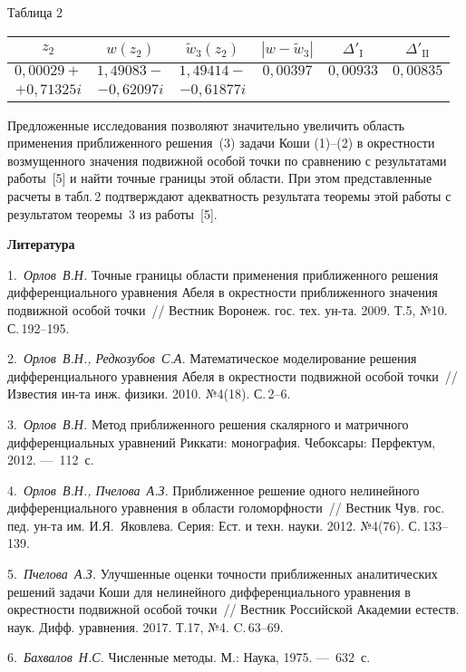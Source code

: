 \begin{table}[tb]
\footnotesize

{\raggedleft Таблица 2

}

\smallskip

{\tabcolsep=2.1mm


\bigskip

\begin{tabular}{|c|c|c|c|c|c|}
\hline
 $z_{2}$&$w(z_{2})$&$\tilde w_{3}(z_{2})$&$|w-\tilde w_{3}|$&$\Delta'_{\mathrm{I}}$&$\Delta'_{\mathrm{II}}$\\
\hline
 $0,00029+$&$1,49083-$&$1,49414-$&$0,00397$&$0,00933$&$0,00835$\\
 $+0,71325i$&$-0,62097i$&$-0,61877i$&&&\\
\hline
\end{tabular}

}
\end{table}

Предложенные исследования позволяют значительно увеличить область применения приближенного решения~(3) задачи
Коши (1)--(2) в окрестности возмущенного значения подвижной особой точки по сравнению с результатами
работы~[5] и найти точные границы этой области. При этом представленные расчеты в табл.\,2 подтверждают
адекватность результата теоремы этой работы с результатом теоремы~3 из работы~[5].

\smallskip
\centerline{\bf Литература}\nopagebreak

1.~{\it Орлов~В.Н.} Точные границы области применения приближенного решения дифференциального уравнения Абеля
в окрестности приближенного значения подвижной особой точки~// Вестник Воронеж. гос. тех. ун-та. 2009. Т.5,
№10. С.\,192--195.

2.~{\it Орлов~В.Н., Редкозубов~С.А.} Математическое моделирование решения дифференциального уравнения Абеля в
окрестности подвижной особой точки~// Известия ин-та инж. физики. 2010. №4(18). С.\,2--6.

3.~{\it Орлов~В.Н.} Метод приближенного решения скалярного и матричного дифференциальных уравнений Риккати:
монография. Чебоксары: Перфектум, 2012. ---~112~с.

4.~{\it Орлов~В.Н., Пчелова~А.З.} Приближенное решение одного нелинейного дифференциального уравнения в
области голоморфности~// Вестник Чув. гос. пед. ун-та им. И.Я.~Яковлева. Серия: Ест. и техн. науки. 2012.
№4(76). С.\,133--139.

5.~{\it Пчелова~А.З.} Улучшенные оценки точности приближенных аналитических решений задачи Коши для
нелинейного дифференциального уравнения в окрестности подвижной особой точки~// Вестник Российской Академии
естеств. наук. Дифф. уравнения. 2017. Т.17, №4. C.\,63--69.

6.~{\it Бахвалов~Н.С.} Численные методы. М.: Наука, 1975. ---~632~с.

